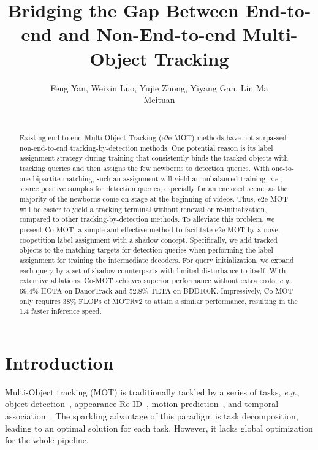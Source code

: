 \documentclass{article}
\title{Bridging the Gap Between End-to-end and Non-End-to-end Multi-Object Tracking}
\author{Feng Yan, Weixin Luo, Yujie Zhong, Yiyang Gan, Lin Ma \\
  Meituan \\
  \texttt{} \\
}
\begin{document}
\maketitle

\def\thefootnote{}\def\thefootnote{\arabic{footnote}}


\begin{abstract}
Existing end-to-end Multi-Object Tracking (e2e-MOT) methods have not surpassed non-end-to-end tracking-by-detection methods. One potential reason is its label assignment strategy during training that consistently binds the tracked objects with tracking queries and then assigns the few newborns to detection queries. With one-to-one bipartite matching, such an assignment will yield an unbalanced training, \textit{i.e.}, scarce positive samples for detection queries, especially for an enclosed scene, as the majority of the newborns come on stage at the beginning of videos. Thus, e2e-MOT will be easier to yield a tracking terminal without renewal or re-initialization, compared to other tracking-by-detection methods. To alleviate this problem, we present Co-MOT, a simple and effective method to facilitate e2e-MOT by a novel coopetition label assignment with a shadow concept. Specifically, we add tracked objects to the matching targets for detection queries when performing the label assignment for training the intermediate decoders. For query initialization, we expand each query by a set of shadow counterparts with limited disturbance to itself. With extensive ablations, Co-MOT achieves superior performance without extra costs, \textit{e.g.}, 69.4\% HOTA on DanceTrack and 52.8\% TETA on BDD100K. 
Impressively, Co-MOT only requires 38\% FLOPs of MOTRv2 to attain a similar performance, resulting in the 1.4 faster  inference speed. 

\end{abstract}


\section{Introduction}
Multi-Object tracking (MOT) is traditionally tackled by a series of tasks, \textit{e.g.}, object detection~\cite{zou2023object, tan2020efficientdet, redmon2016you, ge2021yolox}, appearance Re-ID~\cite{zheng2016person, li2018harmonious, bertinetto2016fully}, motion prediction~\cite{lefevre2014survey, welch1995introduction}, and temporal association~\cite{kuhn1955hungarian}. The sparkling advantage of this paradigm is task decomposition, leading to an optimal solution for each task. However, it lacks global optimization for the whole pipeline. 
\end{document}
